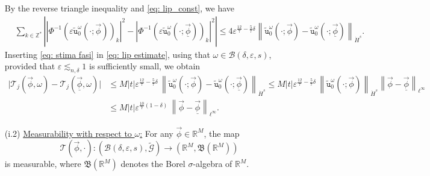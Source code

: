 \documentclass[a4paper,10pt,reqno]{article}
\theoremstyle{definition}
\theoremstyle{plain}
\theoremstyle{plain}
\theoremstyle{definition}
\theoremstyle{plain}
\theoremstyle{plain}
\theoremstyle{plain}
\theoremstyle{definition}
\theoremstyle{definition}
\newcommand{\norm}[1]{\left\lVert #1 \right\rVert}
\def \Z{\mathbb Z}
\def \R{\mathbb R}
\def \tu{\mathtt{u}}
\begin{document}
\begin{itemize}
By the reverse triangle inequality and \eqref{eq: lip_const}, we have
\begin{equation} \label{eq: stima fasi}
\begin{split}
& \sum_{k \in \Z^*} \left \lvert |\Phi^{-1}(\varepsilon \widetilde{\tu}_0^{\omega}(\cdot ; \vec{\phi}))_k|^2 - |\Phi^{-1}(\varepsilon \widetilde{\tu}_0^{\omega}(\cdot ; \underline{\vec{\phi}}))_k|^2 \right \rvert \le 4\varepsilon^{\frac{12}{7} - \frac57 \delta} \norm{\widetilde{\tu}_0^{\omega}(\cdot ; \vec{\phi}) - \widetilde{\tu}_0^{\omega}(\cdot ; \underline{\vec{\phi}})}_{\dot{H}^s}.
\end{split}
\end{equation}
Inserting \eqref{eq: stima fasi} in \eqref{eq: lip estimate}, using that $\omega\in \mathcal{B}(\delta,\varepsilon,s)$, provided that $\varepsilon \lesssim_{n,\delta} 1$ is sufficiently small, we obtain
\[
\begin{split}
\lvert \mathcal{T}_j(\vec{\phi},\omega) - \mathcal{T}_j(\underline{\vec{\phi}},\omega) \rvert & \le M |t| \varepsilon^{\frac{12}{7} - \frac57 \delta} \, \norm{\widetilde{\tu}_0^{\omega}(\cdot ; \vec{\phi}) - \widetilde{\tu}_0^{\omega}(\cdot ; \underline{\vec{\phi}})}_{\dot{H}^s} \le M |t| \varepsilon^{\frac{12}{7} - \frac57 \delta} \,\norm{\widetilde{\tu}_0^{\omega}(\cdot ; \vec{\phi})}_{\dot{H}^s} \norm{\vec{\phi} - \underline{\vec{\phi}} }_{\ell^{\infty}} \\
& \le M |t| \varepsilon^{\frac{10}{7} (1-\delta)} \,  \norm{\vec{\phi} - \underline{\vec{\phi}} }_{\ell^{\infty}}.
\end{split}
\]


\item[(i.2)] \underline{Measurability with respect to $\omega$:} For any $\vec{\phi} \in \R^M$, the map
\[
\mathcal{T}(\vec{\phi},\cdot) : ( \mathcal{B}(\delta,\varepsilon,s) , \widetilde{\mathcal{G}} ) \longrightarrow ( \R^M , \mathfrak{B}(\R^M))
\]
is measurable, where $\mathfrak{B}(\R^M)$ denotes the Borel $\sigma$-algebra of $\R^M$.


\end{itemize}
\end{document}
